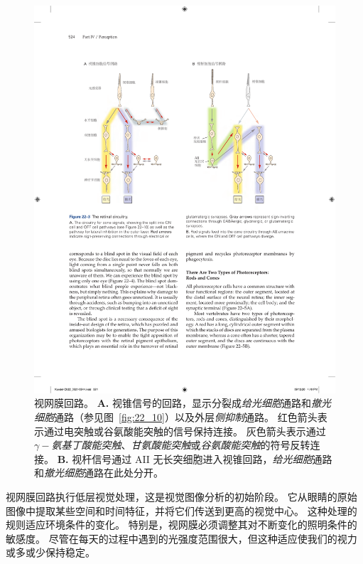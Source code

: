 \begin{figure}[htbp]
	\centering
	\includegraphics[width=1.0\linewidth]{chap22/fig_22_3}
	\caption{视网膜回路。
		\textbf{A.} 视锥信号的回路，显示分裂成\textit{给光细胞}通路和\textit{撤光细胞}通路（参见图~\ref{fig:22_10}）以及外层\textit{侧抑制}通路。
		红色箭头表示通过电突触或谷氨酸能突触的信号保持连接。
		灰色箭头表示通过\textit{$\gamma-$氨基丁酸能突触}、\textit{甘氨酸能突触}或\textit{谷氨酸能突触}的符号反转连接。
		\textbf{B.} 视杆信号通过 AII 无长突细胞进入视锥回路，\textit{给光细胞}通路和\textit{撤光细胞}通路在此处分开。}
	\label{fig:22_3}
\end{figure}


视网膜回路执行低层视觉处理，这是视觉图像分析的初始阶段。
它从眼睛的原始图像中提取某些空间和时间特征，并将它们传送到更高的视觉中心。
这种处理的规则适应环境条件的变化。
特别是，视网膜必须调整其对不断变化的照明条件的敏感度。
尽管在每天的过程中遇到的光强度范围很大，但这种适应使我们的视力或多或少保持稳定。


